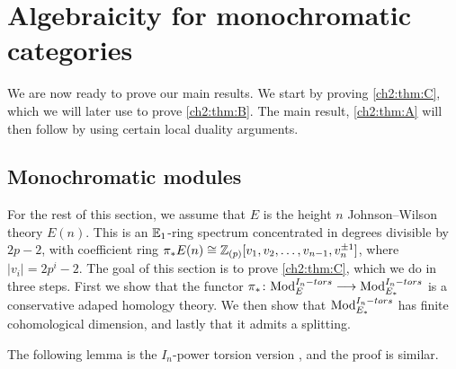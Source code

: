 
\section{Algebraicity for monochromatic categories}

We are now ready to prove our main results. We start by proving \cref{ch2:thm:C}, which we will later use to prove \cref{ch2:thm:B}. The main result, \cref{ch2:thm:A} will then follow by using certain local duality arguments. 

\subsection{Monochromatic modules}
\label{ch2:ssec:algebraicity-modules}

For the rest of this section, we assume that $E$ is the height $n$ Johnson--Wilson theory $E(n)$. This is an $\mathbb{E}_1$-ring spectrum concentrated in degrees divisible by $2p-2$, with coefficient ring $\pi_* E(n) \cong \mathbb{Z}_{(p)}[v_1, v_2, \ldots, v_{n-1}, v_n^{\pm 1}]$, where $|v_i| = 2p^i-2$. The goal of this section is to prove \cref{ch2:thm:C}, which we do in three steps. First we show that the functor $\pi_*\colon \mathrm{Mod}_{E}^{I_n-tors} \longrightarrow \mathrm{Mod}_{E_*}^{I_n-tors}$ is a conservative adaped homology theory. We then show that $\mathrm{Mod}_{E_*}^{I_n-tors}$ has finite cohomological dimension, and lastly that it admits a splitting. 

The following lemma is the $I_n$-power torsion version \cite[3.14]{barthel-frankland_15}, and the proof is similar.

